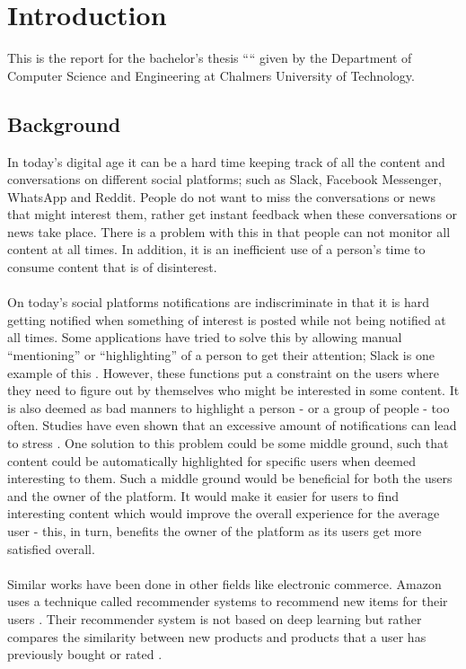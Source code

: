 \chapter{Introduction}
This is the report for the bachelor’s thesis “\varthetitle“ given by the Department of Computer Science and Engineering at Chalmers University of Technology.

\section{Background} \label{Section_ref}
In today’s digital age it can be a hard time keeping track of all the content and conversations on different social platforms; such as Slack, Facebook Messenger, WhatsApp and Reddit. People do not want to miss the conversations or news that might interest them, rather get instant feedback when these conversations or news take place. There is a problem with this in that people can not monitor all content at all times. In addition, it is an inefficient use of a person’s time to consume content that is of disinterest.
\\\\
On today’s social platforms notifications are indiscriminate in that it is hard getting notified when something of interest is posted while not being notified at all times. Some applications have tried to solve this by allowing manual “mentioning” or “highlighting” of a person to get their attention; Slack is one example of this \parencite{slack}. However, these functions put a constraint on the users where they need to figure out by themselves who might be interested in some content. It is also deemed as bad manners to highlight a person - or a group of people - too often. Studies have even shown that an excessive amount of notifications can lead to stress \parencite{relaffinity}. One solution to this problem could be some middle ground, such that content could be automatically highlighted for specific users when deemed interesting to them. Such a middle ground would be beneficial for both the users and the owner of the platform. It would make it easier for users to find interesting content which would improve the overall experience for the average user - this, in turn, benefits the owner of the platform as its users get more satisfied overall.
\\\\
Similar works have been done in other fields like electronic commerce. Amazon uses a technique called recommender systems to recommend new items for their users \parencite{amazonfiltering}. Their recommender system is not based on deep learning but rather compares the similarity between new products and products that a user has previously bought or rated \parencite{amazonfiltering}.

